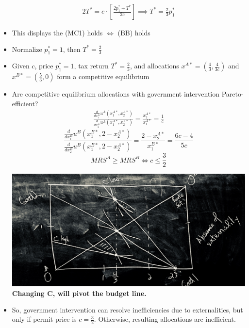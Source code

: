 \documentclass[twoside]{article}
\begin{document}
\begin{itemize}
\[\begin{aligned}
2T^* = c \cdot \left[\frac{2p_1^* + T^*}{2c} \right] \implies T^* = \frac{2}{3} p_1^*
\end{aligned}\]
\item This displays the (MC1) holds \(\iff\) (BB) holds
\item Normalize \(p_1^* = 1\), then \(T^* = \frac{2}{3}\)
\item Given \(c\), price \(p_1^* =1\), tax return \(T^* = \frac{2}{3}\), and allocations \(x^{A*} = \left(\frac{4}{3}, \frac{4}{3c}\right)\) and \(x^{B*} = \left(\frac{5}{3}, 0\right)\) form a competitive equilibrium
\item Are competitive equilibrium allocations with government intervention Pareto-efficient?
\[\begin{aligned}
\frac{\frac{d}{dx_1^A} u^A(x_1^{A*}, x_2^{A*})}{\frac{d}{dx_2^A} u^A(x_1^{A*}, x_2^{A*})} = \frac{x_2^{A*}}{x_1^{A*}} = \frac{1}{c} 
\end{aligned}\]
\[
\frac{\frac{d}{dx_1^B} u^B(x_1^{B*}, 2 - x_2^{A*})}{\frac{d}{dx_2^B} u^B(x_1^{B*}, 2 - x_2^{A*})} = \frac{2-x_2^{A*}}{x_1^{B*}} = \frac{6c-4}{5c}\]
\[MRS^A \geq MRS^B \iff c \leq \frac{3}{2}\]
\begin{center}
\includegraphics[scale=0.1]{32}\\
\textbf{Changing C, will pivot the budget line.}
\end{center}
\item So, government intervention can resolve inefficiencies due to externalities, but only if permit price is \(c = \frac{3}{2}\). Otherwise, resulting allocations are inefficient. 
\end{itemize}
\end{document}
